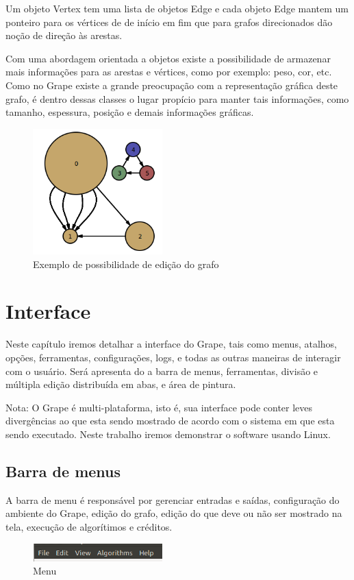 \documentclass[a4paper]{abnt}
\begin{document}
Um objeto Vertex tem uma lista de objetos Edge e cada objeto Edge mantem um ponteiro para os vértices de de início em fim que para grafos direcionados dão noção de direção às arestas.

Com uma abordagem orientada a objetos existe a possibilidade de armazenar mais informações para as arestas e vértices, como por exemplo: peso, cor, etc. Como no Grape existe a grande preocupação com a representação gráfica deste grafo, é dentro dessas classes o lugar propício para manter tais informações, como tamanho, espessura, posição e demais informações gráficas.
\begin{figure}[htb]
    \centering
	\includegraphics[width=5cm]{graph_struct.png}
	\caption{Exemplo de possibilidade de edição do grafo}
	\label{img_graph_struct}
\end{figure}

\chapter{Interface}
Neste capítulo iremos detalhar a interface do Grape, tais como menus, atalhos, opções, ferramentas, configurações, logs, e todas as outras maneiras de interagir com o usuário. Será apresenta do a barra de menus, ferramentas, divisão e múltipla edição distribuída em abas, e área de pintura.

Nota: O Grape é multi-plataforma, isto é, sua interface pode conter leves divergências ao que esta sendo mostrado de acordo com o sistema em que esta sendo executado. Neste trabalho iremos demonstrar o software usando Linux.

\section{Barra de menus}
A barra de menu é responsável por gerenciar entradas e saídas, configuração do ambiente do Grape, edição do grafo, edição do que deve ou não ser mostrado na tela, execução de algorítimos e créditos.
\begin{figure}[htb]
    \centering
	\includegraphics[width=5cm]{grape_menu.png}
	\caption{Menu}
	\label{img_grape_menu}
\end{figure}
\end{document}
